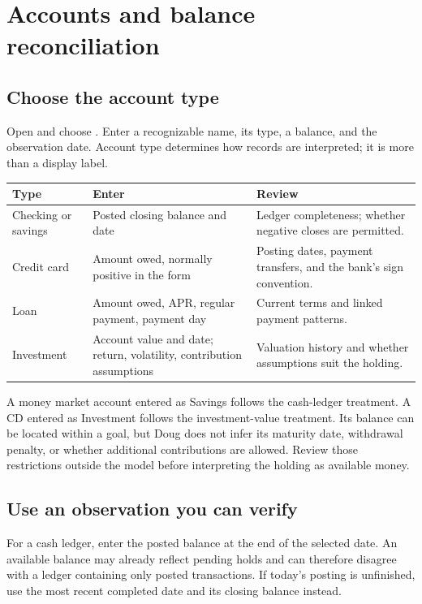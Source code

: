 \chapter{Accounts and balance reconciliation}\label{ch:accounts}
\section{Choose the account type}
Open  and choose . Enter a recognizable name, its type, a balance, and the observation date. Account type determines how records are interpreted; it is more than a display label.

\begin{tabularx}{\textwidth}{@{}lYY@{}}
\toprule Type & Enter & Review\\\midrule
Checking or savings & Posted closing balance and date & Ledger completeness; whether negative closes are permitted.\\
Credit card & Amount owed, normally positive in the form & Posting dates, payment transfers, and the bank's sign convention.\\
Loan & Amount owed, APR, regular payment, payment day & Current terms and linked payment patterns.\\
Investment & Account value and date; return, volatility, contribution assumptions & Valuation history and whether assumptions suit the holding.\\
\bottomrule
\end{tabularx}

A money market account entered as Savings follows the cash-ledger treatment. A CD entered as Investment follows the investment-value treatment. Its balance can be located within a goal, but Doug does not infer its maturity date, withdrawal penalty, or whether additional contributions are allowed. Review those restrictions outside the model before interpreting the holding as available money.

\section{Use an observation you can verify}
For a cash ledger, enter the posted balance at the end of the selected date. An available balance may already reflect pending holds and can therefore disagree with a ledger containing only posted transactions. If today's posting is unfinished, use the most recent completed date and its closing balance instead.

